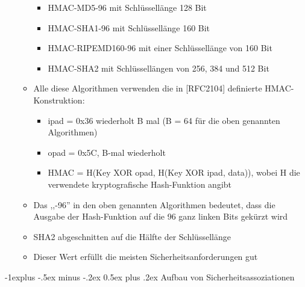 \documentclass[a4paper]{article}
\makeatletter
\renewcommand{\subsection}{\@startsection{subsection}{2}{0mm}%
 {-1explus -.5ex minus -.2ex}%
 {0.5ex plus .2ex}%
 {\normalfont\normalsize\bfseries}}
\makeatother
\begin{document}
\begin{multicols}{3}
\begin{itemize}
\begin{itemize}
                        \begin{itemize}
                            \item
                                  HMAC-MD5-96 mit Schlüssellänge 128 Bit
                            \item
                                  HMAC-SHA1-96 mit Schlüssellänge 160 Bit
                            \item
                                  HMAC-RIPEMD160-96 mit einer Schlüssellänge von 160 Bit
                            \item
                                  HMAC-SHA2 mit Schlüssellängen von 256, 384 und 512 Bit
                        \end{itemize}
                  \item
                        Alle diese Algorithmen verwenden die in {[}RFC2104{]} definierte
                        HMAC-Konstruktion:

                        \begin{itemize}
                            \item
                                  ipad = 0x36 wiederholt B mal (B = 64 für die oben genannten
                                  Algorithmen)
                            \item
                                  opad = 0x5C, B-mal wiederholt
                            \item
                                  HMAC = H(Key XOR opad, H(Key XOR ipad, data)), wobei H die
                                  verwendete kryptografische Hash-Funktion angibt
                        \end{itemize}
                  \item
                        Das ,,-96'' in den oben genannten Algorithmen bedeutet, dass die
                        Ausgabe der Hash-Funktion auf die 96 ganz linken Bits gekürzt wird
                  \item
                        SHA2 abgeschnitten auf die Hälfte der Schlüssellänge
                  \item
                        Dieser Wert erfüllt die meisten Sicherheitsanforderungen gut
              \end{itemize}
    \end{itemize}


    \subsection{Aufbau von
        Sicherheitsassoziationen}


\end{multicols}
\end{document}

